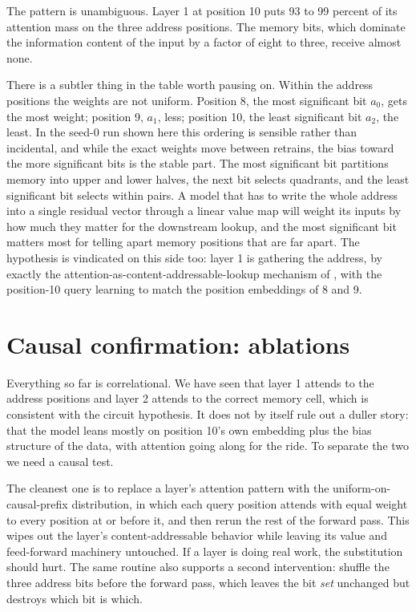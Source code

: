 The pattern is unambiguous. Layer 1 at position 10 puts 93 to 99 percent of its
attention mass on the three address positions. The memory bits, which dominate
the information content of the input by a factor of eight to three, receive
almost none.

There is a subtler thing in the table worth pausing on. Within the address
positions the weights are not uniform. Position 8, the most significant bit
$a_0$, gets the most weight; position 9, $a_1$, less; position 10, the least
significant bit $a_2$, the least. In the seed-0 run shown here this ordering is sensible rather than incidental, and while the exact weights move between retrains, the bias toward the more significant bits is the stable part. The
most significant bit partitions memory into upper and lower halves, the next bit
selects quadrants, and the least significant bit selects within pairs. A model
that has to write the whole address into a single residual vector through a
linear value map will weight its inputs by how much they matter for the
downstream lookup, and the most significant bit matters most for telling apart
memory positions that are far apart. The hypothesis is vindicated on this side
too: layer 1 is gathering the address, by exactly the
attention-as-content-addressable-lookup mechanism of , with
the position-10 query learning to match the position embeddings of 8 and 9.

\section{Causal confirmation: ablations}\label{sec:ablations}

Everything so far is correlational. We have seen that layer 1 attends to the
address positions and layer 2 attends to the correct memory cell, which is
consistent with the circuit hypothesis. It does not by itself rule out a duller
story: that the model leans mostly on position 10's own embedding plus the bias
structure of the data, with attention going along for the ride. To separate the
two we need a causal test.

The cleanest one is to replace a layer's attention pattern with the
uniform-on-causal-prefix distribution, in which each query position attends with
equal weight to every position at or before it, and then rerun the rest of the
forward pass. This wipes out the layer's content-addressable behavior while
leaving its value and feed-forward machinery untouched. If a layer is doing real
work, the substitution should hurt. The same routine also supports a second
intervention: shuffle the three address bits before the forward pass, which
leaves the bit \emph{set} unchanged but destroys which bit is which.

